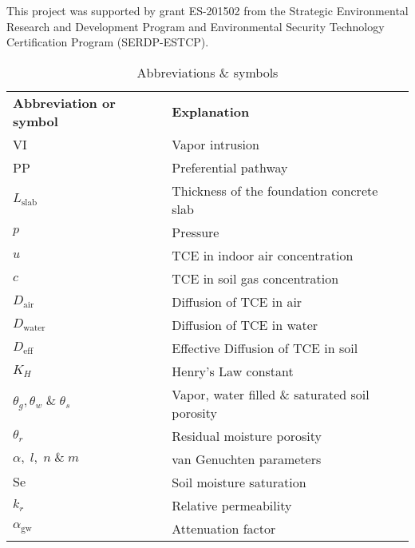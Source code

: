 \documentclass[journal=esthag,manuscript=article]{achemso}
\begin{document}
\begin{comment}
The insert circles in figures \ref{fig:soil_30_hr} and \ref{fig:soil_42_hr} also show that for the simulated time period, only a small amount of the contaminant enters the structure (as evident by the blue low concentration zone around the perimeter), yet a very large increase in $\alpha_\mathrm{gw}$ occurs.
The concentration in the rest of the sub-base is unchanged.
This suggests that once a PP has deposited contaminant underneath a structure, it may persist for a long time period, as pointed out by \citeauthor{guo_vapor_2015}\cite{guo_vapor_2015}.

\end{comment}

\begin{acknowledgement}
This project was supported by grant ES-201502 from the Strategic Environmental Research and Development Program and Environmental Security Technology Certification Program (SERDP-ESTCP).
\end{acknowledgement}

\begin{table}[htb!]
  \caption{Abbreviations \& symbols}
  \begin{tabular}{l l}
  \toprule
  \textbf{Abbreviation or symbol}     & \textbf{Explanation} \\
  VI                                  & Vapor intrusion \\
  PP                                  & Preferential pathway \\
  $L_\mathrm{slab}$                   & Thickness of the foundation concrete slab \\
  $p$                                 & Pressure \\
  $u$                                 & TCE in indoor air concentration \\
  $c$                                 & TCE in soil gas concentration \\
  $D_\mathrm{air}$                    & Diffusion of TCE in air \\
  $D_\mathrm{water}$                  & Diffusion of TCE in water \\
  $D_\mathrm{eff}$                    & Effective Diffusion of TCE in soil \\
  $K_H$                               & Henry's Law constant \\
  $\theta_g, \theta_w\;\&\;\theta_s$  & Vapor, water filled \& saturated soil porosity \\
  $\theta_r$                          & Residual moisture porosity \\
  $\alpha,\; l,\; n\;\&\; m$          & van Genuchten parameters \\
  $\mathrm{Se}$                       & Soil moisture saturation \\
  $k_r$                               & Relative permeability \\
  $\alpha_\mathrm{gw}$                & Attenuation factor \\
  \bottomrule
  \end{tabular}
\end{table}


\end{document}
